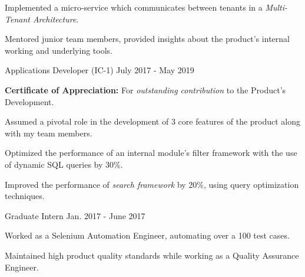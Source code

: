 \begin{cventries}
{\begin{cvitems}
        \item {Implemented a micro-service which communicates between tenants in a \textit{Multi-Tenant Architecture}.}
        \item {Mentored junior team members, provided insights about the product's internal working and underlying tools.}
      \end{cvitems}
    }
  \cvexperiencecontinued
    {Applications Developer (IC-1)}
    {}
    {July 2017 - May 2019}
    {
      \begin{cvitems}
        \item {\textbf{Certificate of Appreciation:} For \textit{outstanding contribution} to the Product's Development.}
        \item {Assumed a pivotal role in the development of 3 core features of the product along with my team members.}
        \item {Optimized the performance of an internal module's filter framework with the use of dynamic SQL queries by 30\%.}
        \item {Improved the performance of \textit{search framework} by 20\%, using query optimization techniques.}
      \end{cvitems}
    }
  \cvexperiencecontinued
    {Graduate Intern}
    {}
    {Jan. 2017 - June 2017}
    {
      \begin{cvitems}
        \item {Worked as a Selenium Automation Engineer, automating over a 100 test cases.}
        \item {Maintained high product quality standards while working as a Quality Assurance Engineer.}
      \end{cvitems}
    }
\end{cventries}